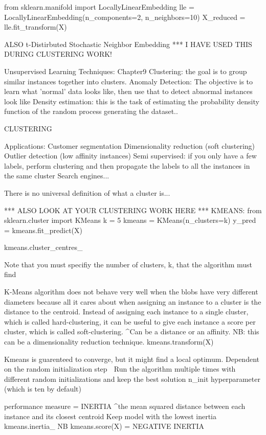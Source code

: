 from sklearn.manifold import LocallyLinearEmbedding
lle = LocallyLinearEmbedding(n_components=2, n_neighbors=10)
X_reduced = lle.fit_transform(X)

ALSO t-Distirbuted Stochastic Neighbor Embedding
*** I HAVE USED THIS DURING CLUSTERING WORK!

Unsupervised Learning Techniques: Chapter9
Clustering: the goal is to group similar instances together into clusters.
Anomaly Detection: The objective is to learn what 'normal' data looks like,
then use that to detect abnormal instances look like
Density estimation: this is the task of estimating the probability density function of the random process generating the dataset..

CLUSTERING

Applications:
Customer segmentation
Dimensionality reduction (soft clustering)
Outlier detection (low affinity instances)
Semi supervised: if you only have a few labels, perform clustering and then propagate the labels to all the instances in the same cluster
Search engines...

There is no universal definition of what a cluster is...

*** ALSO LOOK AT YOUR CLUSTERING WORK HERE ***
KMEANS:
from sklearn.cluster import KMeans
k = 5
kmeans = KMeans(n_clusters=k)
y_pred = kmeans.fit_predict(X)

kmeans.cluster_centres_

Note that you must specifiy the number of clusters, k, that the algorithm must find

K-Means algorithm does not behave very well when the blobs have very different diameters because all it cares about
when assigning an instance to a cluster is the distance to the centroid.
Instead of assigning each instance to a single cluster, which is called hard-clustering,
it can be useful to give each instance a score per cluster, which is called soft-clustering.
^Can be a distance or an affinity. NB: this can be a dimensionality reduction technique.
kmeans.transform(X)

Kmeans is guarenteed to converge, but it might find a local optimum.
Dependent on the random initialization step
^^^ Run the algorithm multiple times with different random initializations and keep the best solution
n_init hyperparameter (which is ten by default)

performance measure = INERTIA
^the mean squared distance between each instance and its closest centroid
Keep model with the lowest inertia
kmeans.inertia_
NB kmeans.score(X) = NEGATIVE INERTIA

